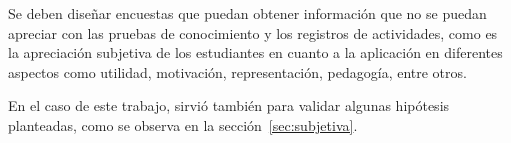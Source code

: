 Se deben diseñar encuestas que puedan obtener información que no se puedan
apreciar con las pruebas de conocimiento y los registros de actividades, como es
la apreciación subjetiva de los estudiantes en cuanto a la aplicación en
diferentes aspectos como utilidad, motivación, representación, pedagogía, entre
otros. 

En el caso de este trabajo, sirvió también para validar algunas hipótesis
planteadas, como se observa en la sección~\ref{sec:subjetiva}.


